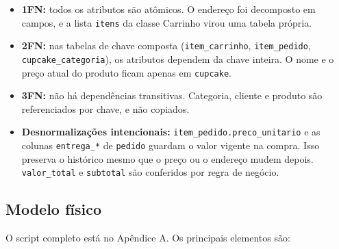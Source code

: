 \documentclass[12pt]{article}
\begin{document}
\begin{itemize}
\item \textbf{1FN:} todos os atributos são atômicos. O endereço foi decomposto em campos, e a lista \texttt{itens} da classe Carrinho virou uma tabela própria.
\item \textbf{2FN:} nas tabelas de chave composta (\texttt{item\_carrinho}, \texttt{item\_pedido}, \texttt{cupcake\_categoria}), os atributos dependem da chave inteira. O nome e o preço atual do produto ficam apenas em \texttt{cupcake}.
\item \textbf{3FN:} não há dependências transitivas. Categoria, cliente e produto são referenciados por chave, e não copiados.
\item \textbf{Desnormalizações intencionais:} \texttt{item\_pedido.preco\_unitario} e as colunas \texttt{entrega\_*} de \texttt{pedido} guardam o valor vigente na compra. Isso preserva o histórico mesmo que o preço ou o endereço mudem depois. \texttt{valor\_total} e \texttt{subtotal} são conferidos por regra de negócio.
\end{itemize}

\subsection{Modelo físico}

O script completo está no Apêndice A. Os principais elementos são:
\end{document}
